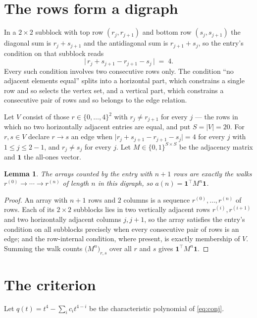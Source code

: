 \documentclass[11pt,a4paper]{article}
\theoremstyle{plain}
\newtheorem{lemma}[theorem]{Lemma}
\theoremstyle{definition}
\begin{document}
\section{The rows form a digraph}

In a $2\times2$ subblock with top row $(r_j,r_{j+1})$ and bottom row $(s_j,s_{j+1})$ the
diagonal sum is $r_j+s_{j+1}$ and the antidiagonal sum is $r_{j+1}+s_j$, so the entry's
condition on that subblock reads
\[
\bigl|\,r_j+s_{j+1}-r_{j+1}-s_j\,\bigr|\;=\;4.
\]
Every such condition involves two consecutive rows only. The condition ``no adjacent elements equal'' splits into a horizontal
part, which constrains a single row and so selects the vertex set, and a vertical part,
which constrains a consecutive pair of rows and so belongs to the edge relation.

Let $V$ consist of those $r\in\{0,\dots,4\}^{2}$ with $r_j\ne r_{j+1}$ for every
$j$ --- the rows in which no two horizontally adjacent entries are equal, and put $S=|V|=20$. For $r,s\in V$ declare $r\to s$ an edge
when $\bigl|r_j+s_{j+1}-r_{j+1}-s_j\bigr|=4$ for every $j$ with
$1\le j\le2-1$, and $r_j\ne s_j$ for every $j$. Let $M\in\{0,1\}^{S\times S}$ be the adjacency matrix and $\mathbf{1}$
the all-ones vector.

\begin{lemma}\label{lem:walk}
The arrays counted by the entry with $n+1$ rows are exactly the walks
$r^{(0)}\to\cdots\to r^{(n)}$ of length $n$ in this digraph, so
$a(n)=\mathbf{1}^{\!\top}M^{n}\mathbf{1}$.
\end{lemma}

\begin{proof}
An array with $n+1$ rows and $2$ columns is a sequence $r^{(0)},\dots,r^{(n)}$ of
rows. Each of its $2\times2$ subblocks lies in two vertically adjacent rows
$r^{(i)},r^{(i+1)}$ and two horizontally adjacent columns $j,j+1$, so the array satisfies
the entry's condition on all subblocks precisely when every consecutive pair of rows is an
edge; and the row-internal condition, where present, is exactly membership of $V$. Summing
the walk counts $\bigl(M^{n}\bigr)_{r,s}$ over all $r$ and $s$ gives
$\mathbf{1}^{\!\top}M^{n}\mathbf{1}$.
\end{proof}

\section{The criterion}

Let $q(t)=t^{4}-\sum_i c_i t^{4-i}$ be the characteristic polynomial of
\eqref{eq:conj}.
\end{document}
